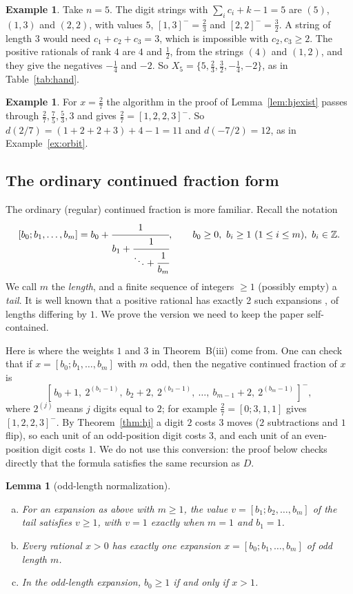 \documentclass[11pt]{article}
\newtheorem{lemma}[theorem]{Lemma}
\theoremstyle{definition}
\newtheorem{example}[theorem]{Example}
\theoremstyle{remark}
\newcommand{\Z}{\mathbb{Z}}
\newcommand{\hj}[1]{[#1]^{-}}                 %
\begin{document}
\begin{example}\label{ex:rank5}
Take $n=5$. The digit strings with $\sum_ic_i+k-1=5$ are $(5)$, $(1,3)$ and $(2,2)$, with values
$5$, $\hj{1,3}=\tfrac23$ and $\hj{2,2}=\tfrac32$. A string of length $3$ would need
$c_1+c_2+c_3=3$, which is impossible with $c_2,c_3\ge2$. The positive rationals of rank $4$ are $4$
and $\tfrac12$, from the strings $(4)$ and $(1,2)$, and they give the negatives $-\tfrac14$ and
$-2$. So $X_5=\{5,\tfrac23,\tfrac32,-\tfrac14,-2\}$, as in Table~\ref{tab:hand}.
\end{example}

\begin{example}\label{ex:27}
For $x=\tfrac27$ the algorithm in the proof of Lemma~\ref{lem:hjexist} passes through
$\tfrac27,\tfrac75,\tfrac53,3$ and gives $\tfrac27=\hj{1,2,2,3}$. So $d(2/7)=(1+2+2+3)+4-1=11$ and
$d(-7/2)=12$, as in Example~\ref{ex:orbit}.
\end{example}

\subsection{The ordinary continued fraction form}

The ordinary (regular) continued fraction is more familiar. Recall the notation
\[
[b_0;b_1,\dots,b_m]=b_0+\cfrac{1}{b_1+\cfrac{1}{\ddots+\cfrac{1}{b_m}}},
\qquad b_0\ge0,\ b_i\ge1\ (1\le i\le m),\ b_i\in\Z .
\]
We call $m$ the \emph{length}, and a finite sequence of integers $\ge1$ (possibly empty) a
\emph{tail}. It is well known that a positive rational has exactly 2 such expansions
\cite[Ch.~X]{hardywright}, of lengths differing by $1$. We prove the version we need to keep the
paper self-contained.

Here is where the weights $1$ and $3$ in Theorem~B(iii) come from. One can check that if
$x=[b_0;b_1,\dots,b_m]$ with $m$ odd, then the negative continued fraction of $x$ is
\[
\hj{\,b_0+1,\ 2^{(b_1-1)},\ b_2+2,\ 2^{(b_3-1)},\ \dots,\ b_{m-1}+2,\ 2^{(b_m-1)}\,},
\]
where $2^{(j)}$ means $j$ digits equal to $2$; for example $\tfrac27=[0;3,1,1]$ gives
$\hj{1,2,2,3}$. By Theorem~\ref{thm:hj} a digit $2$ costs $3$ moves ($2$ subtractions and $1$
flip), so each unit of an odd-position digit costs $3$, and each unit of an even-position digit
costs $1$. We do not use this conversion: the proof below checks directly that the formula
satisfies the same recursion as $D$.

\begin{lemma}[odd-length normalization]\label{lem:regstruct}
\begin{enumerate}[(a)]
\item For an expansion as above with $m\ge1$, the value $v=[b_1;b_2,\dots,b_m]$ of the tail satisfies
$v\ge1$, with $v=1$ exactly when $m=1$ and $b_1=1$.
\item Every rational $x>0$ has exactly one expansion $x=[b_0;b_1,\dots,b_m]$ of \emph{odd} length $m$.
\item In the odd-length expansion, $b_0\ge1$ if and only if $x>1$.
\end{enumerate}
\end{lemma}
\end{document}
